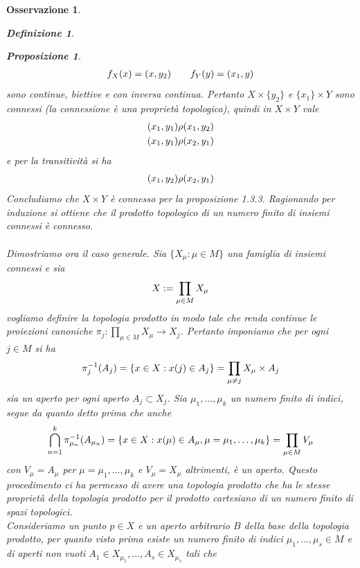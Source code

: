 \documentclass[oneside, 11pt]{amsbook}
\makeatletter
\newcommand{\0}{{(0)}}
\newcommand{\3}{{(3)}}
\theoremstyle{colonplain}
\newtheorem{prop}[thm]{Proposizione}
\theoremstyle{colondefinition}
\newtheorem{defn}[thm]{Definizione}
\theoremstyle{colonremark}
\newtheorem{rmk}[thm]{Osservazione}
\numberwithin{equation}{chapter}
\renewcommand{\proofname}{Dimostrazione}
\renewenvironment{proof}[1][\proofname]{\par
  \pushQED{\end{proof}}%
  \normalfont \topsep6\p@\@plus6\p@\relax
  \trivlist
  \item[\hskip\labelsep\bfseries #1:]\ignorespaces
}{%
  \popQED\endtrivlist\@endpefalse
}
\makeatother
\begin{document}
\begin{rmk}
\begin{defn}
\begin{prop}
\begin{proof}
\begin{align}
    f_X(x) = (x, y_2) \qquad f_Y(y) = (x_1, y) \notag
\end{align}
sono continue, biettive e con inversa continua. Pertanto $X \times \{ y_2 \}$ e $\{ x_1 \} \times Y$ sono connessi (la connessione è una proprietà topologica), quindi in $X \times Y$ vale
\begin{align}
    (x_1, y_1) \rho (x_1, y_2) \notag \\
    (x_1, y_1) \rho (x_2, y_1) \notag
\end{align}
e per la transitività si ha
\begin{align}
    (x_1, y_2) \rho (x_2, y_1) \notag
\end{align}
Concludiamo che $X \times Y$ è connesso per la \textit{proposizione 1.3.3}. Ragionando per induzione si ottiene che il prodotto topologico di un numero finito di insiemi connessi è connesso. \\ \\
Dimostriamo ora il caso generale. Sia $\{ X_\mu : \mu \in M \}$ una famiglia di insiemi connessi e sia 
\begin{align}
    X := \prod_{\mu \in M} X_\mu \notag
\end{align}
vogliamo definire la topologia prodotto in modo tale che renda continue le \textit{proiezioni canoniche} $\pi_j : \prod_{\mu \in M} X_\mu \longrightarrow X_j$. Pertanto imponiamo che per ogni $j \in M$ si ha
\begin{align}
    \pi_j^{-1}(A_j) = \{ x \in X : x(j) \in A_j \} = \prod_{\mu \neq j} X_\mu \times A_j \notag
\end{align}
sia un aperto per ogni aperto $A_j \subset X_j$. Sia $\mu_1, \dots, \mu_k$ un numero finito di indici, segue da quanto detto prima che anche
\begin{align}
    \bigcap_{n = 1}^k \pi_{\mu_n}^{-1}(A_{\mu_n}) = \{ x \in X : x(\mu) \in A_{\mu}, \mu = \mu_1, \dots, \mu_k \} = \prod_{\mu \in M} V_\mu \notag
\end{align}
con $V_\mu = A_\mu$ per $\mu = \mu_1, \dots, \mu_k$ e $V_\mu = X_\mu$ altrimenti, è un aperto. Questo procedimento ci ha permesso di avere una topologia prodotto che ha le stesse proprietà della topologia prodotto per il prodotto cartesiano di un numero finito di spazi topologici. \\
Consideriamo un punto $p \in X$ e un aperto arbitrario $B$ della base della topologia prodotto, per quanto visto prima esiste un numero finito di indici $\mu_1, \dots, \mu_s \in M$ e di aperti non vuoti $A_1 \in X_{\mu_1}, \dots, A_s \in X_{\mu_s}$ tali che

\end{proof}
\end{prop}
\end{defn}
\end{rmk}
\end{document}
